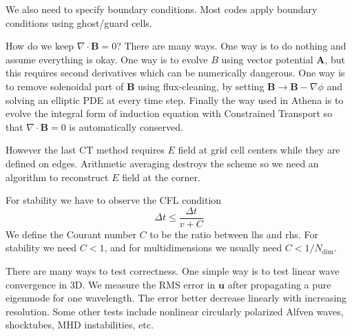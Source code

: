 \documentclass[letterpaper, 11pt]{article}
\numberwithin{equation}{section}
\numberwithin{figure}{section}
\begin{document}
We also need to specify boundary conditions. Most codes apply boundary
conditions using ghost/guard cells.

How do we keep $\nabla\cdot \mathbf{B} = 0$? There are many ways. One way is to
do nothing and assume everything is okay. One way is to evolve $B$ using vector
potential $\mathbf{A}$, but this requires second derivatives which can be
numerically dangerous. One way is to remove solenoidal part of $\mathbf{B}$
using flux-cleaning, by setting $\mathbf{B} \to \mathbf{B} - \nabla\phi$ and
solving an elliptic PDE at every time step. Finally the way used in Athena is to
evolve the integral form of induction equation with Constrained Transport so
that $\nabla\cdot \mathbf{B} = 0$ is automatically conserved.

However the last CT method requires $E$ field at grid cell centers while they
are defined on edges. Arithmetic averaging destroys the scheme so we need an
algorithm to reconstruct $E$ field at the corner.

For stability we have to observe the CFL condition
\begin{equation}
  \label{eq:13}
  \Delta t \leq \frac{\Delta t}{v + C}
\end{equation}
We define the Courant number $C$ to be the ratio between lhs and rhs. For
stability we need $C<1$, and for multidimensions we usually need $C <
1/N_\text{dim}$.

There are many ways to test correctness. One simple way is to test linear wave
convergence in 3D. We measure the RMS error in $\mathbf{u}$ after propagating
a pure eigenmode for one wavelength. The error better decrease linearly with
increasing resolution. Some other tests include nonlinear circularly polarized
Alfven waves, shocktubes, MHD instabilities, etc.
\end{document}

